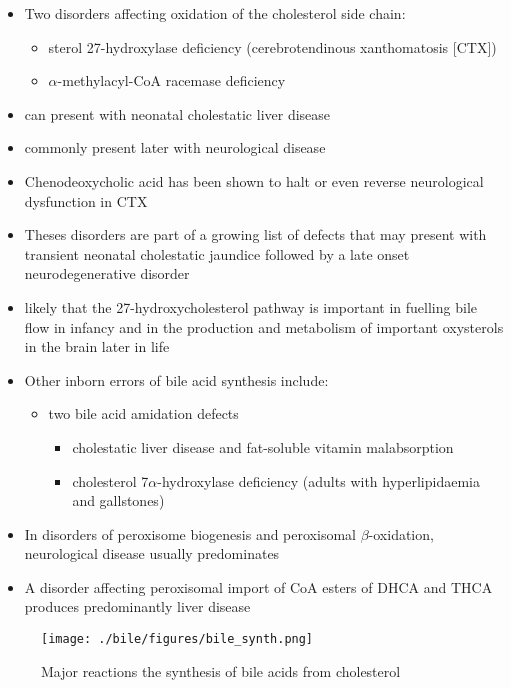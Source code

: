 \documentclass{scrartcl}
\begin{document}
\begin{itemize}
\item Two disorders affecting oxidation of the cholesterol side chain:
\begin{itemize}
\item sterol 27-hydroxylase deficiency (cerebrotendinous xanthomatosis [CTX])
\item \(\alpha\)-methylacyl-CoA racemase deficiency
\end{itemize}
\item can present with neonatal cholestatic liver disease
\item commonly present later with neurological disease
\item Chenodeoxycholic acid has been shown to halt or even reverse
neurological dysfunction in CTX
\item Theses disorders are part of a growing list of defects that may
present with transient neonatal cholestatic jaundice followed by a
late onset neurodegenerative disorder
\item likely that the 27-hydroxycholesterol pathway is important in
fuelling bile flow in infancy and in the production and metabolism
of important oxysterols in the brain later in life
\item Other inborn errors of bile acid synthesis include:
\begin{itemize}
\item two bile acid amidation defects
\begin{itemize}
\item cholestatic liver disease and fat-soluble vitamin malabsorption
\item cholesterol 7\(\alpha\)-hydroxylase deficiency (adults with hyperlipidaemia and gallstones)
\end{itemize}
\end{itemize}
\item In disorders of peroxisome biogenesis and peroxisomal
\(\beta\)-oxidation, neurological disease usually predominates
\item A disorder affecting peroxisomal import of CoA esters of DHCA and
THCA produces predominantly liver disease
\end{itemize}

\begin{figure}[htbp]
\centering
\texttt{[image: ./bile/figures/bile\_synth.png]}
\caption{\label{fig:org47985f6}
Major reactions the synthesis of bile acids from cholesterol}
\end{figure}
\end{document}
